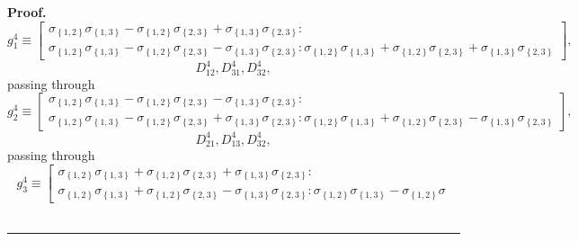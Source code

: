 \documentclass{unswthesis}
\newenvironment{proof}[1][Proof]{\noindent\textbf{#1.} }{\ \rule{0.5em}{0.5em}}
\begin{document}
\begin{proof}
\begin{equation*}
g_{1}^{4}\equiv \left[ 
\begin{array}{c}
\sigma _{\left\{ 1,2\right\} }\sigma _{\left\{ 1,3\right\} }-\sigma
_{\left\{ 1,2\right\} }\sigma _{\left\{ 2,3\right\} }+\sigma _{\left\{
1,3\right\} }\sigma _{\left\{ 2,3\right\} }: \\ 
\sigma _{\left\{ 1,2\right\} }\sigma _{\left\{ 1,3\right\} }-\sigma
_{\left\{ 1,2\right\} }\sigma _{\left\{ 2,3\right\} }-\sigma _{\left\{
1,3\right\} }\sigma _{\left\{ 2,3\right\} }:\sigma _{\left\{ 1,2\right\}
}\sigma _{\left\{ 1,3\right\} }+\sigma _{\left\{ 1,2\right\} }\sigma
_{\left\{ 2,3\right\} }+\sigma _{\left\{ 1,3\right\} }\sigma _{\left\{
2,3\right\} }%
\end{array}%
\right] , 
\end{equation*}%
\begin{equation*}
D_{12}^{4},D_{31}^{4},D_{32}^{4}, 
\end{equation*}%
passing through 
\begin{equation*}
g_{2}^{4}\equiv \left[ 
\begin{array}{c}
\sigma _{\left\{ 1,2\right\} }\sigma _{\left\{ 1,3\right\} }-\sigma
_{\left\{ 1,2\right\} }\sigma _{\left\{ 2,3\right\} }-\sigma _{\left\{
1,3\right\} }\sigma _{\left\{ 2,3\right\} }: \\ 
\sigma _{\left\{ 1,2\right\} }\sigma _{\left\{ 1,3\right\} }-\sigma
_{\left\{ 1,2\right\} }\sigma _{\left\{ 2,3\right\} }+\sigma _{\left\{
1,3\right\} }\sigma _{\left\{ 2,3\right\} }:\sigma _{\left\{ 1,2\right\}
}\sigma _{\left\{ 1,3\right\} }+\sigma _{\left\{ 1,2\right\} }\sigma
_{\left\{ 2,3\right\} }-\sigma _{\left\{ 1,3\right\} }\sigma _{\left\{
2,3\right\} }%
\end{array}%
\right] , 
\end{equation*}%
\begin{equation*}
D_{21}^{4},D_{13}^{4},D_{32}^{4}, 
\end{equation*}%
passing through 
\begin{equation*}
g_{3}^{4}\equiv \left[ 
\begin{array}{c}
\sigma _{\left\{ 1,2\right\} }\sigma _{\left\{ 1,3\right\} }+\sigma
_{\left\{ 1,2\right\} }\sigma _{\left\{ 2,3\right\} }+\sigma _{\left\{
1,3\right\} }\sigma _{\left\{ 2,3\right\} }: \\ 
\sigma _{\left\{ 1,2\right\} }\sigma _{\left\{ 1,3\right\} }+\sigma
_{\left\{ 1,2\right\} }\sigma _{\left\{ 2,3\right\} }-\sigma _{\left\{
1,3\right\} }\sigma _{\left\{ 2,3\right\} }:\sigma _{\left\{ 1,2\right\}
}\sigma _{\left\{ 1,3\right\} }-\sigma _{\left\{ 1,2\right\} }\sigma

\end{array}
\end{equation*}
\end{proof}
\end{document}
